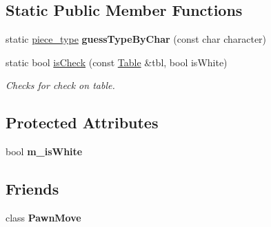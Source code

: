 \subsection*{Static Public Member Functions}
\begin{DoxyCompactItemize}
\item 
\hypertarget{classChEngn_1_1Move_a8c5b8516c1043705ab0d382420973bdc}{
static \hyperlink{namespaceChEngn_a2a35c185f259757a78e937575b8ed483}{piece\_\-type} {\bfseries guessTypeByChar} (const char character)}
\label{classChEngn_1_1Move_a8c5b8516c1043705ab0d382420973bdc}

\item 
static bool \hyperlink{classChEngn_1_1Move_ae6623ccd38b7e0bb27e0ac993af7b795}{isCheck} (const \hyperlink{classChEngn_1_1Table}{Table} \&tbl, bool isWhite)
\begin{DoxyCompactList}\small\item\em Checks for check on table. \item\end{DoxyCompactList}\end{DoxyCompactItemize}
\subsection*{Protected Attributes}
\begin{DoxyCompactItemize}
\item 
\hypertarget{classChEngn_1_1Move_aa125cc28066cc4659bc5f2319101ffde}{
bool {\bfseries m\_\-isWhite}}
\label{classChEngn_1_1Move_aa125cc28066cc4659bc5f2319101ffde}

\end{DoxyCompactItemize}
\subsection*{Friends}
\begin{DoxyCompactItemize}
\item 
\hypertarget{classChEngn_1_1Move_acc0d3e212bbbb343193fc4d76340947c}{
class {\bfseries PawnMove}}
\label{classChEngn_1_1Move_acc0d3e212bbbb343193fc4d76340947c}

\end{DoxyCompactItemize}



